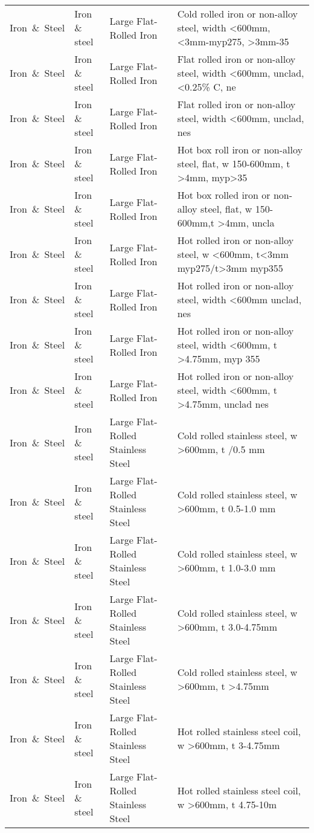 \begin{appendices}
\begin{xltabular}{\textwidth}{|p{0.07\textwidth}|p{0.12\textwidth}|p{0.20\textwidth}|p{0.5\textwidth}|}
Iron\ \&\ Steel & Iron \& steel & Large Flat-Rolled Iron & Cold rolled iron or non-alloy steel, width <600mm, <3mm-myp275, >3mm-35 \\
Iron\ \&\ Steel & Iron \& steel & Large Flat-Rolled Iron & Flat rolled iron or non-alloy steel, width <600mm, unclad, <0.25\% C, ne \\
Iron\ \&\ Steel & Iron \& steel & Large Flat-Rolled Iron & Flat rolled iron or non-alloy steel, width <600mm, unclad, nes \\
Iron\ \&\ Steel & Iron \& steel & Large Flat-Rolled Iron & Hot box roll iron or non-alloy steel, flat, w 150-600mm, t >4mm, myp>35 \\
Iron\ \&\ Steel & Iron \& steel & Large Flat-Rolled Iron & Hot box rolled iron or non-alloy steel, flat, w 150-600mm,t >4mm, uncla \\
Iron\ \&\ Steel & Iron \& steel & Large Flat-Rolled Iron & Hot rolled iron or non-alloy steel, w <600mm, t<3mm myp275/t>3mm myp355 \\
Iron\ \&\ Steel & Iron \& steel & Large Flat-Rolled Iron & Hot rolled iron or non-alloy steel, width <600mm unclad, nes \\
Iron\ \&\ Steel & Iron \& steel & Large Flat-Rolled Iron & Hot rolled iron or non-alloy steel, width <600mm, t >4.75mm, myp 355 \\
Iron\ \&\ Steel & Iron \& steel & Large Flat-Rolled Iron & Hot rolled iron or non-alloy steel, width <600mm, t >4.75mm, unclad nes \\
Iron\ \&\ Steel & Iron \& steel & Large Flat-Rolled Stainless Steel & Cold rolled stainless steel, w >600mm, t /0.5 mm \\
Iron\ \&\ Steel & Iron \& steel & Large Flat-Rolled Stainless Steel & Cold rolled stainless steel, w >600mm, t 0.5-1.0 mm \\
Iron\ \&\ Steel & Iron \& steel & Large Flat-Rolled Stainless Steel & Cold rolled stainless steel, w >600mm, t 1.0-3.0 mm \\
Iron\ \&\ Steel & Iron \& steel & Large Flat-Rolled Stainless Steel & Cold rolled stainless steel, w >600mm, t 3.0-4.75mm \\
Iron\ \&\ Steel & Iron \& steel & Large Flat-Rolled Stainless Steel & Cold rolled stainless steel, w >600mm, t >4.75mm \\
Iron\ \&\ Steel & Iron \& steel & Large Flat-Rolled Stainless Steel & Hot rolled stainless steel coil, w >600mm, t 3-4.75mm \\
Iron\ \&\ Steel & Iron \& steel & Large Flat-Rolled Stainless Steel & Hot rolled stainless steel coil, w >600mm, t 4.75-10m \\

\end{xltabular}
\end{appendices}
